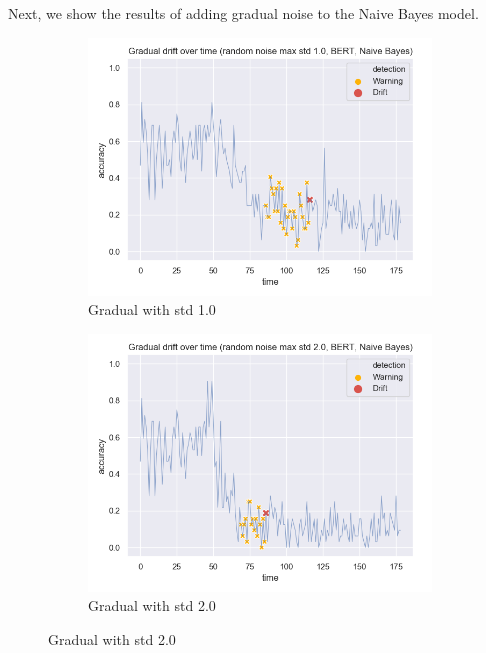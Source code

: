 \documentclass[12pt]{extreport}
\begin{document}
Next, we show the results of adding gradual noise to the Naive Bayes model.

\begin{figure}[H]
\centering
\begin{subfigure}{.5\textwidth}
  \centering
  \includegraphics[width=\linewidth]{assets/detecting-change/gradual_noise_random_std_1_nb_wos_1_BERT.png}
  \caption{Gradual with std 1.0}
  \label{fig:nb-gradual-std-1}
\end{subfigure}%
\begin{subfigure}{.5\textwidth}
  \centering
  \includegraphics[width=\linewidth]{assets/detecting-change/gradual_noise_random_std_2_nb_wos_1_BERT.png}
  \caption{Gradual with std 2.0}
  \label{fig:nb-gradual-std-2}

\end{subfigure}
\end{figure}
\end{document}
